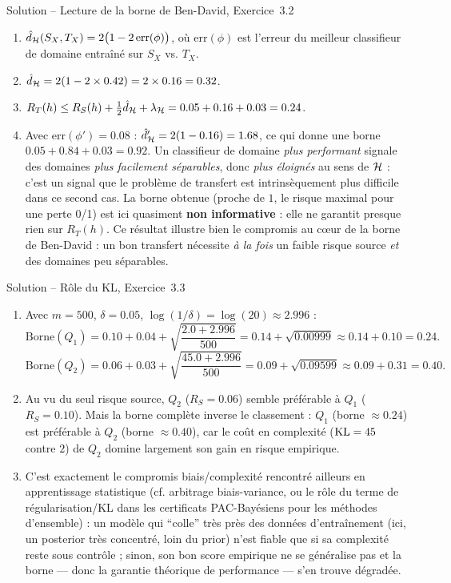 \documentclass[11pt]{article}
\begin{document}
\begin{exercisebox}{Solution -- Lecture de la borne de Ben-David, Exercice~3.2}
\begin{enumerate}[label=(\alph*)]
\item $\hat d_{\mathcal{H}}(S_X,T_X) = 2\big(1-2\,\mathrm{err}(\phi)\big)$, où $\mathrm{err}(\phi)$ est l'erreur
du meilleur classifieur de domaine entraîné sur $S_X$ vs. $T_X$.
\item $\hat d_{\mathcal{H}} = 2(1-2\times 0.42) = 2\times 0.16 = 0.32$.
\item $R_T(h) \le R_S(h) + \tfrac12 \hat d_{\mathcal{H}} + \lambda_{\mathcal{H}} = 0.05 + 0.16 + 0.03 = 0.24$.
\item Avec $\mathrm{err}(\phi')=0.08$ : $\hat d'_{\mathcal{H}} = 2(1-0.16)=1.68$, ce qui donne une borne
$0.05+0.84+0.03=0.92$. Un classifieur de domaine \emph{plus performant} signale des domaines \emph{plus
facilement séparables}, donc \emph{plus éloignés} au sens de $\mathcal{H}$ : c'est un signal que le problème de
transfert est intrinsèquement plus difficile dans ce second cas. La borne obtenue (proche de $1$, le
risque maximal pour une perte 0/1) est ici quasiment \textbf{non informative} : elle ne garantit presque
rien sur $R_T(h)$. Ce résultat illustre bien le compromis au cœur de la borne de Ben-David : un bon
transfert nécessite \emph{à la fois} un faible risque source \emph{et} des domaines peu séparables.
\end{enumerate}
\end{exercisebox}

\begin{exercisebox}{Solution -- Rôle du KL, Exercice~3.3}
\begin{enumerate}[label=(\alph*)]
\item Avec $m=500$, $\delta=0.05$, $\log(1/\delta)=\log(20)\approx 2.996$ :
\[
\text{Borne}(Q_1) = 0.10+0.04+\sqrt{\frac{2.0+2.996}{500}} = 0.14+\sqrt{0.00999}\approx 0.14+0.10=0.24.
\]
\[
\text{Borne}(Q_2) = 0.06+0.03+\sqrt{\frac{45.0+2.996}{500}} = 0.09+\sqrt{0.09599}\approx 0.09+0.31=0.40.
\]
\item Au vu du seul risque source, $Q_2$ ($R_S=0.06$) semble préférable à $Q_1$ ($R_S=0.10$). Mais la
borne complète inverse le classement : $Q_1$ (borne $\approx 0.24$) est préférable à $Q_2$ (borne
$\approx 0.40$), car le coût en complexité ($\operatorname{KL}=45$ contre $2$) de $Q_2$ domine largement son gain en
risque empirique.
\item C'est exactement le compromis biais/complexité rencontré ailleurs en apprentissage statistique (cf.
arbitrage biais-variance, ou le rôle du terme de régularisation/KL dans les certificats PAC-Bayésiens pour
les méthodes d'ensemble) : un modèle qui \enquote{colle} très près des données d'entraînement (ici, un
posterior très concentré, loin du prior) n'est fiable que si sa complexité reste sous contrôle ; sinon,
son bon score empirique ne se généralise pas et la borne --- donc la garantie théorique de performance
--- s'en trouve dégradée.
\end{enumerate}
\end{exercisebox}
\end{document}
